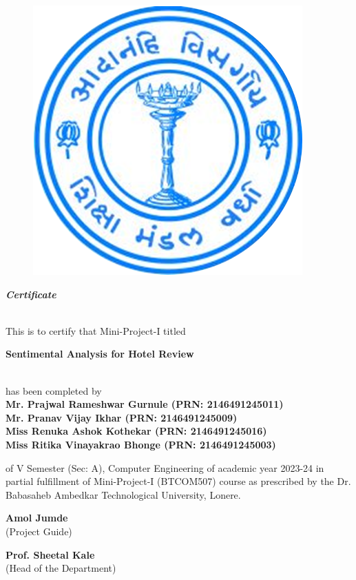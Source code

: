 \documentclass[a4paper, 12pt]{report}
\begin{document}
\begin{frontmatter}
\begin{titlepage}
\begin{center}
	\begin{figure}[h]
	\centering
	\includegraphics[width=0.3\linewidth]{./logo1}
	\end{figure}	
	\begin{LARGE}
	\textbf{\textit {Certificate}}
	\end{LARGE}\\[1.2cm]
	This is to certify that Mini-Project-I titled\\[0.5cm]
	\begin{large}
	\large\textbf{Sentimental Analysis for Hotel Review}
	\end{large}\\[0.8cm] 
	
	has been completed by \\[0.8cm]
	\textbf{Mr. Prajwal Rameshwar Gurnule (PRN: 2146491245011)}\\[0.25cm]
	\textbf{Mr. Pranav Vijay Ikhar (PRN: 2146491245009)}\\[0.25cm]
	\textbf{Miss Renuka Ashok Kothekar (PRN: 2146491245016)}\\[0.25cm]
	\textbf{Miss Ritika Vinayakrao Bhonge (PRN: 2146491245003)}\\[0.25cm]
\end{center}
of V Semester (Sec: A), Computer Engineering of academic year 2023-24 in partial fulfillment of Mini-Project-I (BTCOM507) course as prescribed by the Dr. Babasaheb Ambedkar Technological University, Lonere.
\vspace{1.5cm}

\begin{multicols}{2}
\begin{center}
\textbf{Amol Jumde}\hspace{5cm}\\
(Project Guide)\hspace{5cm}\\
\end{center}

\begin{center}
\textbf{Prof. Sheetal Kale}\\
(Head of the Department)\\
\end{center}
\vspace{1.0cm}
\end{multicols}


\end{titlepage}
\end{frontmatter}
\end{document}
